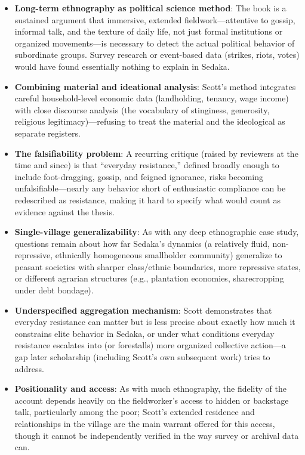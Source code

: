 \documentclass[12pt]{article}
\begin{document}
\begin{itemize}[leftmargin=*, itemsep=4pt]
    \item \textbf{Long-term ethnography as political science method}: The book is a sustained argument that immersive, extended fieldwork---attentive to gossip, informal talk, and the texture of daily life, not just formal institutions or organized movements---is necessary to detect the actual political behavior of subordinate groups. Survey research or event-based data (strikes, riots, votes) would have found essentially nothing to explain in Sedaka.
    \item \textbf{Combining material and ideational analysis}: Scott's method integrates careful household-level economic data (landholding, tenancy, wage income) with close discourse analysis (the vocabulary of stinginess, generosity, religious legitimacy)---refusing to treat the material and the ideological as separate registers.
    \item \textbf{The falsifiability problem}: A recurring critique (raised by reviewers at the time and since) is that ``everyday resistance,'' defined broadly enough to include foot-dragging, gossip, and feigned ignorance, risks becoming unfalsifiable---nearly any behavior short of enthusiastic compliance can be redescribed as resistance, making it hard to specify what would count as evidence against the thesis.
    \item \textbf{Single-village generalizability}: As with any deep ethnographic case study, questions remain about how far Sedaka's dynamics (a relatively fluid, non-repressive, ethnically homogeneous smallholder community) generalize to peasant societies with sharper class/ethnic boundaries, more repressive states, or different agrarian structures (e.g., plantation economies, sharecropping under debt bondage).
    \item \textbf{Underspecified aggregation mechanism}: Scott demonstrates that everyday resistance can matter but is less precise about exactly how much it constrains elite behavior in Sedaka, or under what conditions everyday resistance escalates into (or forestalls) more organized collective action---a gap later scholarship (including Scott's own subsequent work) tries to address.
    \item \textbf{Positionality and access}: As with much ethnography, the fidelity of the account depends heavily on the fieldworker's access to hidden or backstage talk, particularly among the poor; Scott's extended residence and relationships in the village are the main warrant offered for this access, though it cannot be independently verified in the way survey or archival data can.
\end{itemize}
\end{document}
